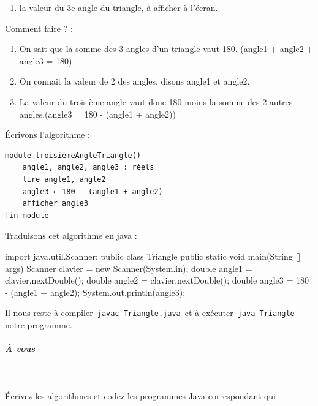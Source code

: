\documentclass[11pt,a4paper]{article}
\begin{document}
					\begin{enumerate}
				
			\item la valeur du 3e angle du triangle, \`a afficher \`a l'\'ecran.
					\end{enumerate}
				
          Comment faire ? :
          
					\begin{enumerate}
				
			\item On sait que la somme des 3 angles d'un triangle vaut 180\textdegree . (angle1 + angle2 + angle3 = 180)
			\item On connait la valeur de 2 des angles, disons angle1 et angle2.
			\item La valeur du troisi\`eme angle vaut donc 180 moins la somme des 2 autres angles.(angle3 = 180 - (angle1 + angle2))
					\end{enumerate}
				
          \'Ecrivons l'algorithme :
          \begin{verbatim}
module troisièmeAngleTriangle()
    angle1, angle2, angle3 : réels
    lire angle1, angle2
    angle3 ← 180 - (angle1 + angle2)
    afficher angle3
fin module
          \end{verbatim}
          Traduisons cet algorithme en java :
          \begin{Java}
import java.util.Scanner;
public class Triangle{
    public static void main(String [] args) {
        Scanner clavier = new Scanner(System.in);
        double angle1 = clavier.nextDouble();
        double angle2 = clavier.nextDouble();
        double angle3 = 180 - (angle1 + angle2);
        System.out.println(angle3);
    }
}
        \end{Java}
        Il nous reste \`a compiler \,\verb|javac Triangle.java|\, et \`a ex\'ecuter \,\verb|java Triangle|\, notre programme.
        
            \par
        
			
		\subparagraph{\`A vous} 
		
					\textcolor{white}{.} \par
				
        \'Ecrivez les algorithmes et codez les programmes Java correspondant qui 
          
\end{document}

